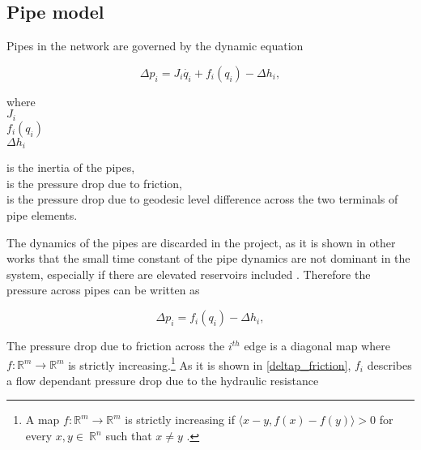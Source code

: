 \subsection{Pipe model}
\label{pipe_component}

Pipes in the network are governed by the dynamic equation

\begin{equation}
\label{complete_pipemodel}
  \Delta p_i = J_i \dot{q_i} + f_i(q_i) - \Delta h_i,
\end{equation}

 \begin{minipage}[t]{0.20\textwidth}
where\\
\hspace*{8mm} $J_i$ \\
\hspace*{8mm} $f_i(q_i)$ \\
\hspace*{8mm} $\Delta h_i$ 
\end{minipage}
\begin{minipage}[t]{0.68\textwidth}
\vspace*{2mm}
is the inertia of the pipes,\\ 
is the pressure drop due to friction,\\
is the pressure drop due to geodesic level difference across the two terminals of pipe elements.
\end{minipage}

The dynamics of the pipes are discarded in the project, as it is shown in other works that the small time constant of the pipe dynamics are not dominant in the system, especially if there are elevated reservoirs included \cite{8thsemester_project,kenneth_houe}. Therefore the pressure across pipes can be written as


\begin{equation}
\label{complete_pipemodel1}
  \Delta p_i = f_i(q_i) - \Delta h_i,
\end{equation}

The pressure drop due to friction across the $i^{th}$ edge is a diagonal map where $f: \mathbb{R}^{m} \rightarrow \mathbb{R}^{m} $ is strictly increasing.\footnote{A map $f: \mathbb{R}^{m} \rightarrow \mathbb{R}^{m} $ is strictly increasing if $\langle x-y, f(x)-f(y) \rangle > 0$ for every $x,y \in \: \mathbb{R}^{n}$ such that $x \neq y$ \cite{oneinput_paper}.} As it is shown in \eqref{deltap_friction}, $f_i$ describes a flow dependant pressure drop due to the hydraulic resistance

